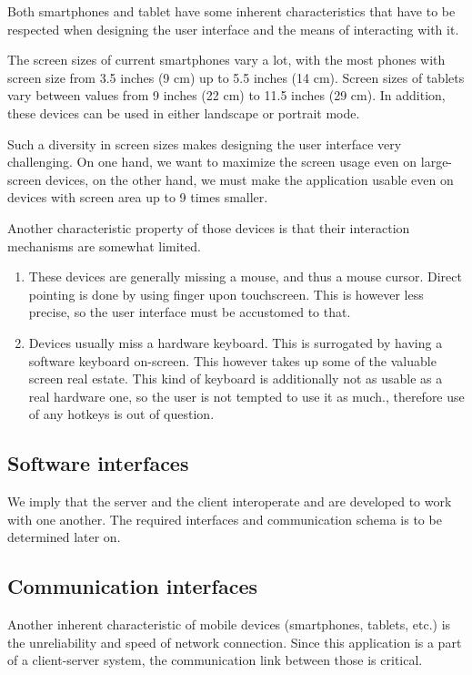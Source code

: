 \documentclass[11pt]{book}
\begin{document}
Both smartphones and tablet have some inherent characteristics that have to be respected when designing the user interface and the means of interacting with it.

The screen sizes of current smartphones vary a lot, with the most phones with screen size from 3.5 inches (9 cm) up to 5.5 inches (14 cm). Screen sizes of tablets vary between values from 9 inches (22 cm) to 11.5 inches (29 cm). In addition, these devices can be used in either landscape or portrait mode.

Such a diversity in screen sizes makes designing the user interface very challenging. On one hand, we want to maximize the screen usage even on large-screen devices, on the other hand, we must make the application usable even on devices with screen area up to 9 times smaller.

Another characteristic property of those devices is that their interaction mechanisms are somewhat limited.

\begin{enumerate}
  \item These devices are generally missing a mouse, and thus a mouse cursor. Direct pointing is done by using finger upon touchscreen. This is however less precise, so the user interface must be accustomed to that.
  \item Devices usually miss a hardware keyboard. This is surrogated by having a software keyboard on-screen. This however takes up some of the valuable screen real estate. This kind of keyboard is additionally not as usable as a real hardware one, so the user is not tempted to use it as much., therefore use of any hotkeys is out of question.
\end{enumerate}

\subsection{Software interfaces}
We imply that the server and the client interoperate and are developed to work with one another. The required interfaces and communication schema is to be determined later on.

\subsection{Communication interfaces}
Another inherent characteristic of mobile devices (smartphones, tablets, etc.) is the unreliability and speed of network connection. Since this application is a part of a client-server system, the communication link between those is critical.
\end{document}
